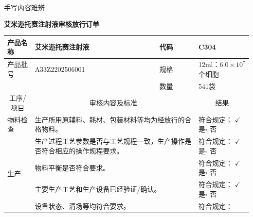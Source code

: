 \documentclass[UTF8,10pt,a4paper,fontset=fandol]{ctexart}
\newcommand{\fieldvalue}[1]{#1}
\newcommand{\handwritten}[1]{#1}
\let\mathcheckmark\checkmark
\renewcommand{\checkmark}{\ensuremath{\mathcheckmark}}
\begin{document}
\vspace{0.2em}
\noindent\fieldvalue{\handwritten{手写内容难辨}}


\newpage

\begin{center}
\textbf{艾米迩托赛注射液审核放行订单}
\end{center}

\begin{tabularx}{\textwidth}{|p{2.2cm}|X|p{2.2cm}|p{2.2cm}|}
\hline
产品名称 &
\fieldvalue{艾米迩托赛注射液}
& 代码 &
\fieldvalue{C304}
\\ \hline
产品批号 &
\fieldvalue{A33Z2202506001}
& 规格 &
\fieldvalue{12ml：$6.0\times10^{7}$个细胞}
\\ \hline
&& 数量 &
\fieldvalue{541袋}
\\ \hline
\multicolumn{1}{|c|}{工序/项目}
& \multicolumn{2}{c|}{审核内容及标准} & \multicolumn{1}{c|}{结果}
\\ \hline
\multirow{1}{*}{物料检查}
& \multicolumn{2}{l|}{生产所用原辅料、耗材、包装材料等均为经放行的合格物料。}
& 符合规定：
\fieldvalue{\(\checkmark\) 是}\quad $\square$ 否
\\ \hline
\multirow{5}{*}{生产}
& \multicolumn{2}{l|}{生产过程工艺参数是否与工艺规程一致，生产操作是否符合相应的操作规程要求。}
& 符合规定：
\fieldvalue{\(\checkmark\) 是}\quad $\square$ 否
\\ \cline{2-4}
& \multicolumn{2}{l|}{物料平衡是否符合要求。}
& 符合规定：
\fieldvalue{\(\checkmark\) 是}\quad $\square$ 否
\\ \cline{2-4}
& \multicolumn{2}{l|}{主要生产工艺和生产设备已经验证/确认。}
& 符合规定：
\fieldvalue{\(\checkmark\) 是}\quad $\square$ 否
\\ \cline{2-4}
& \multicolumn{2}{l|}{设备状态、清场等均符合要求。}
& 符合规定：

\end{tabularx}
\end{document}
